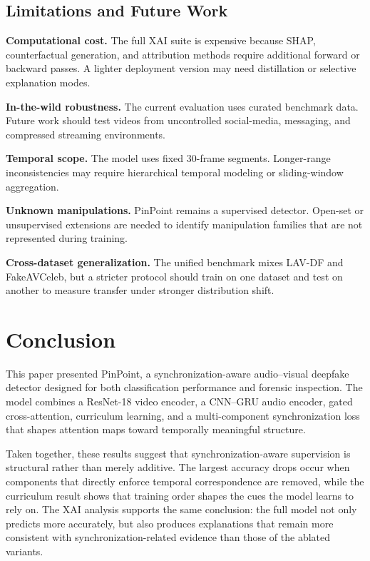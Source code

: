 \documentclass[pdflatex,sn-mathphys-num]{sn-jnl}
\begin{document}
\subsection{Limitations and Future Work}\label{sec6.1}

\textbf{Computational cost.} The full XAI suite is expensive because SHAP, counterfactual generation, and attribution methods require additional forward or backward passes. A lighter deployment version may need distillation or selective explanation modes.

\textbf{In-the-wild robustness.} The current evaluation uses curated benchmark data. Future work should test videos from uncontrolled social-media, messaging, and compressed streaming environments.

\textbf{Temporal scope.} The model uses fixed 30-frame segments. Longer-range inconsistencies may require hierarchical temporal modeling or sliding-window aggregation.

\textbf{Unknown manipulations.} PinPoint remains a supervised detector. Open-set or unsupervised extensions are needed to identify manipulation families that are not represented during training.

\textbf{Cross-dataset generalization.} The unified benchmark mixes LAV-DF and FakeAVCeleb, but a stricter protocol should train on one dataset and test on another to measure transfer under stronger distribution shift.


\section{Conclusion}

This paper presented PinPoint, a synchronization-aware audio--visual deepfake detector designed for both classification performance and forensic inspection. The model combines a ResNet-18 video encoder, a CNN--GRU audio encoder, gated cross-attention, curriculum learning, and a multi-component synchronization loss that shapes attention maps toward temporally meaningful structure.

Taken together, these results suggest that synchronization-aware supervision is structural rather than merely additive. The largest accuracy drops occur when components that directly enforce temporal correspondence are removed, while the curriculum result shows that training order shapes the cues the model learns to rely on. The XAI analysis supports the same conclusion: the full model not only predicts more accurately, but also produces explanations that remain more consistent with synchronization-related evidence than those of the ablated variants.
\end{document}
